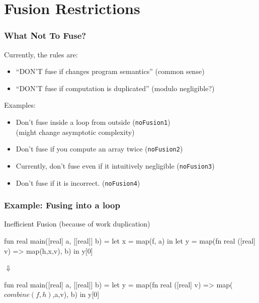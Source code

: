 \documentclass{beamer}
\newcommand{\mymath}[1]{$ #1 $}
\begin{document}
\section{Fusion Restrictions}

\begin{frame}[fragile,t]
  \frametitle{What Not To Fuse?}

  Currently, the rules are:

  \begin{itemize}
  \item ``DON'T fuse if changes program semantics'' (common sense)
  \item ``DON'T fuse if computation is duplicated'' (modulo negligible?)
  \end{itemize}

  \bigskip

  Examples:
  \begin{itemize}
  \item Don't fuse inside a loop from outside (\texttt{noFusion1})\\
    (might change asymptotic complexity) \smallskip

  \item Don't fuse if you compute an array twice (\texttt{noFusion2})\smallskip

  \item Currently, don't fuse even if it intuitively negligible (\texttt{noFusion3})\smallskip

  \item Don't fuse if it is incorrect. (\texttt{noFusion4})
  \end{itemize}

\end{frame}

\begin{frame}[fragile,t]
  \frametitle{Example: Fusing into a loop}

  \begin{block}{Inefficient Fusion (because of work duplication)}
\begin{center}
      \begin{colorcode}[fontsize=\scriptsize]
fun real main([real] a, [[real]] b) =
  let x      = map(f, a)                 in
  let y      = map(fn real ([real] v) =>
                   map(h,x,v), b)        in
  y[0]
      \end{colorcode}
$\Downarrow$
      \begin{colorcode}[fontsize=\scriptsize]
fun real main([real] a, [[real]] b) =
  let y      = map(fn real ([real] v) =>
                   map(\mymath{combine(f,h)},a,v), b) in
  y[0]
      \end{colorcode}
\end{center}
  \end{block}
\end{frame}
\end{document}

